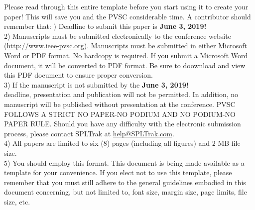 \documentclass[conference]{./pvsctran}
\begin{document}
Please read through this entire template before you start using it to create your paper! This will save you and the PVSC considerable time. A contributor should remember that:
\hfil{}) Deadline to submit this paper is \textbf{June 3, 2019!}\\
2) Manuscripts must be submitted electronically to the conference website (\url{http://www.ieee-pvsc.org}).  Manuscripts must be submitted in either Microsoft Word or PDF format.  No hardcopy is required.  If you submit a Microsoft Word document, it will be converted to PDF format.  Be sure to doownload and view this PDF document to ensure proper conversion.  \\
3) If the manuscript is not submitted by the \textbf{June 3, 2019!}\\ deadline, presentation and publication will not be permitted.  In addition, no manuscript will be published without presentation at the conference.  PVSC FOLLOWS A STRICT NO PAPER-NO PODIUM AND NO PODIUM-NO PAPER RULE.  Should you have any difficulty with the electronic submission process, please contact SPLTrak at \url{help@SPLTrak.com}.\\ 
4) All papers are limited to six (8) pages (including all figures) and 2 MB file size.\\
5)	You should employ this format. This document is being made available as a template for your convenience. If you elect not to use this template, please remember that you must still adhere to the general guidelines embodied in this document concerning, but not limited to, font size, margin size, page limits, file size, etc.\\
\end{document}

